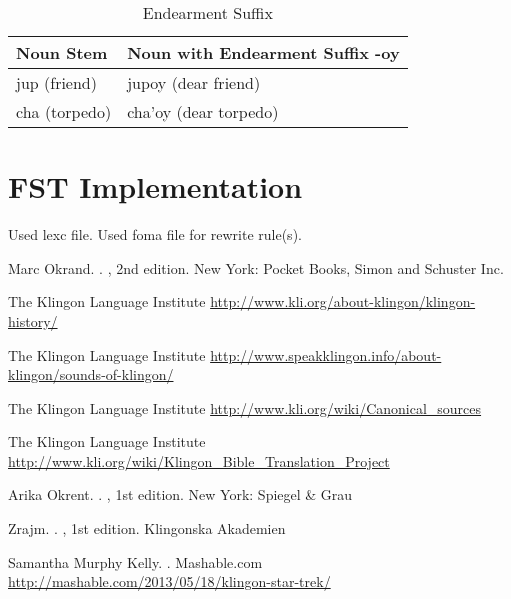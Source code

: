 \documentclass[11pt]{article}
\begin{document}
\begin{table}[h]
\begin{center}
\begin{tabular}{|l|l|}
\hline \bf Noun Stem & \bf Noun with Endearment Suffix -oy \\ \hline
jup (friend) & jupoy (dear friend) \\
cha (torpedo) & cha'oy (dear torpedo) \\
\hline
\end{tabular}
\end{center}
\caption{Endearment Suffix }
\end{table}

\section{FST Implementation}

Used lexc file.
Used foma file for rewrite rule(s).

%
%

\begin{thebibliography}{}

Marc Okrand.
.
, 2nd edition.
\newblock New York: Pocket Books, Simon and Schuster Inc.

\newblock The Klingon Language Institute
\newblock \url{http://www.kli.org/about-klingon/klingon-history/}

\newblock The Klingon Language Institute
\newblock \url{http://www.speakklingon.info/about-klingon/sounds-of-klingon/}

\newblock The Klingon Language Institute
\newblock \url{http://www.kli.org/wiki/Canonical_sources}

\newblock The Klingon Language Institute
\newblock \url{http://www.kli.org/wiki/Klingon_Bible_Translation_Project}

Arika Okrent.
.
, 1st edition.
\newblock New York: Spiegel \& Grau

Zrajm.
.
, 1st edition.
\newblock Klingonska Akademien

Samantha Murphy Kelly.
.
\newblock Mashable.com
\newblock \url{http://mashable.com/2013/05/18/klingon-star-trek/}

\end{thebibliography}
\end{document}
